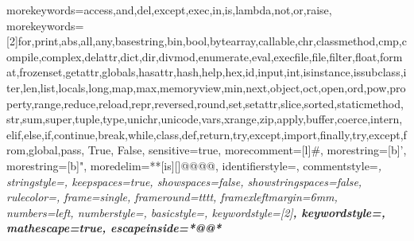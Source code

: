 \usepackage{xcolor}

\newcommand\Pdef{P_{\text{def}}}
\newcommand\Psur{P_{\text{sur}}}
\newcommand\corr{\text{Corr}}
\newcommand\std{\text{Std}}

\DeclareMathOperator{\var}{Var}
\DeclareMathOperator{\cov}{Cov}

\usepackage{hyperref}
\hypersetup{
	breaklinks=true,  %
	colorlinks=true,
	urlcolor=rahmen,
	linkcolor=rahmen,
	citecolor=rahmen,
}
\hypersetup{linkcolor=rahmen}

\providecommand{\tightlist}{\setlength{\itemsep}{0pt}\setlength{\parskip}{0pt}}

\usepackage{subfig} %

\usepackage{cprotect}
 {
	morekeywords={access,and,del,except,exec,in,is,lambda,not,or,raise},
	morekeywords=[2]{for,print,abs,all,any,basestring,bin,bool,bytearray,callable,chr,classmethod,cmp,compile,complex,delattr,dict,dir,divmod,enumerate,eval,execfile,file,filter,float,format,frozenset,getattr,globals,hasattr,hash,help,hex,id,input,int,isinstance,issubclass,iter,len,list,locals,long,map,max,memoryview,min,next,object,oct,open,ord,pow,property,range,reduce,reload,repr,reversed,round,set,setattr,slice,sorted,staticmethod,str,sum,super,tuple,type,unichr,unicode,vars,xrange,zip,apply,buffer,coerce,intern,elif,else,if,continue,break,while,class,def,return,try,except,import,finally,try,except,from,global,pass, True, False},
	sensitive=true,
	morecomment=[l]\#,
	morestring=[b]',
	morestring=[b]",
	moredelim=**[is][\color{black}]{@@}{@@},
	identifierstyle=\color{black}\footnotesize\ttfamily,
    commentstyle=\color{ipython-cyan}\footnotesize\itshape\ttfamily,
	stringstyle=\color{ipython-red}\footnotesize\ttfamily,
	keepspaces=true,
	showspaces=false,
    showstringspaces=false,
	rulecolor=\color{ipython-frame},
	frame=single,
	frameround={t}{t}{t}{t},
	framexleftmargin=6mm,
	numbers=left,
	numberstyle=\color{black},
	basicstyle=\footnotesize\ttfamily,
	keywordstyle=[2]\color{ipython-green}\bfseries\footnotesize\ttfamily, 
	keywordstyle=\color{ipython-purple}\bfseries\footnotesize\ttfamily,
	mathescape=true,
	escapeinside={*@}{@*}
}

